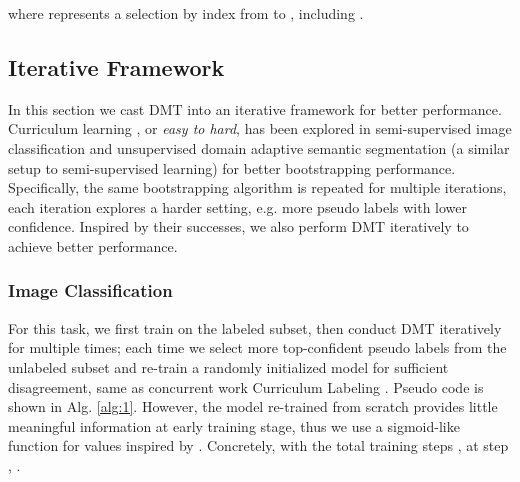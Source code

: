 \documentclass[preprint,review,10pt]{elsarticle}
\begin{document}
where  represents a selection by index from  to , including .



\subsection{Iterative Framework}
\label{sec:42}

In this section we cast DMT into an iterative framework for better performance. Curriculum learning \cite{bengio2009curriculum}, or \textit{easy to hard}, has been explored in semi-supervised image classification \cite{cascante2020curriculum} and unsupervised domain adaptive semantic segmentation (a similar setup to semi-supervised learning) \cite{cbst} for better bootstrapping performance. Specifically, the same bootstrapping algorithm is repeated for multiple iterations, each iteration explores a harder setting, e.g. more pseudo labels with lower confidence. Inspired by their successes, we also perform DMT iteratively to achieve better performance.

\BlankLine


\subsubsection{Image Classification}
\label{sec:421}

For this task, we first train on the labeled subset, then conduct DMT iteratively for multiple times; each time we select more top-confident pseudo labels from the unlabeled subset and re-train a randomly initialized model for sufficient disagreement, same as concurrent work Curriculum Labeling \cite{cascante2020curriculum}. Pseudo code is shown in Alg. \ref{alg:1}. However, the model re-trained from scratch provides little meaningful information at early training stage, thus we use a sigmoid-like function for  values inspired by \cite{tarvainen2017mean}. Concretely, with the total training steps , at step , .
\end{document}
